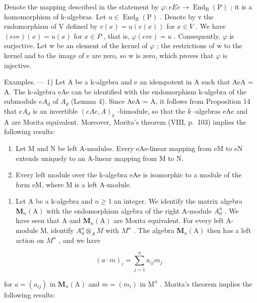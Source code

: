 Denote the mapping described in the statement by \(\varphi:eEe\to\operatorname{End}_{\mathrm{B}}(\mathrm{P})\) ; it is a homomorphism of k-algebras. Let \(u\in\operatorname{End}_{\mathrm{B}}(\mathrm{P})\) . Denote by v the endomorphism of V defined by \(v(x)=u(e(x))\) for \(x\in V\) . We have \((eve)(x)=u(x)\) for \(x\in P\) , that is, \(\varphi(eve)=u\) . Consequently, \(\varphi\) is surjective. Let w be an element of the kernel of \(\varphi\) ; the restrictions of w to the kernel and to the image of e are zero, so w is zero, which proves that \(\varphi\) is injective.

Examples. --- 1) Let A be a k-algebra and e an idempotent in A such that AeA = A. The k-algebra eAe can be identified with the endomorphism k-algebra of the submodule \(eA_{d}\) of \(A_{d}\) (Lemma 4). Since AeA = A, it follows from Proposition 14 that \(eA_{d}\) is an invertible \((eAe, A)_{k}\) -bimodule, so that the \(k\) -algebras eAe and A are Morita equivalent. Moreover, Morita's theorem (VIII, p.~103) implies the following results:

\begin{enumerate}
\def\labelenumi{\alph{enumi})}
\item
  Let M and N be left A-modules. Every eAe-linear mapping from eM to eN extends uniquely to an A-linear mapping from M to N.
\item
  Every left module over the k-algebra eAe is isomorphic to a module of the form eM, where M is a left A-module.
\end{enumerate}

\begin{enumerate}
\def\labelenumi{\arabic{enumi})}
\setcounter{enumi}{1}
\tightlist
\item
  Let A be a k-algebra and \(n \geqslant 1\) an integer. We identify the matrix algebra \(\mathbf{M}_{n}(\mathrm{A})\) with the endomorphism algebra of the right A-module \(A_{d}^{n}\) . We have seen that A and \(\mathbf{M}_{n}(\mathrm{A})\) are Morita equivalent. For every left A-module M, identify \(A_{d}^{n} \otimes_{A} M\) with \(M^{n}\) . The algebra \(\mathbf{M}_{n}(\mathrm{A})\) then has a left action on \(M^{n}\) , and we have
\end{enumerate}

\[
(a \cdot m) _ {i} = \sum_ {j = 1} ^ {n} a _ {i j} m _ {j}
\]

for \(a = (a_{ij})\) in \(\mathbf{M}_n(\mathrm{A})\) and \(m = (m_i)\) in \(\mathrm{M}^n\) . Morita's theorem implies the following results:


